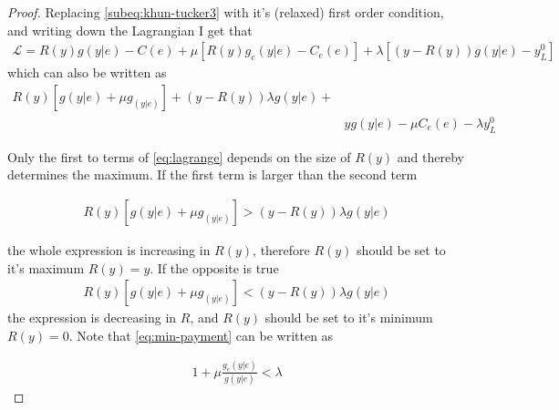 \begin{proof}
Replacing \cref{subeq:khun-tucker3} with it's (relaxed) first order condition, and writing down the Lagrangian I get that 
\begin{align}
    \mathcal{L}=R(y)g(y|e)-C(e)+\mu [R(y)g_e(y|e)-C_e(e)]+\lambda [(y-R(y))g(y|e)-y_L^0]
\end{align}
which can also be written as 
\begin{equation}
\begin{split}
   R(y)\left[g(y|e)+\mu g_(y|e)\right]+(y-R(y))\lambda g(y|e)+ \\
                         & yg(y|e)-\mu C_e(e)-\lambda y_L^0 \label{eq:lagrange}
\end{split}
\end{equation}

Only the first to terms of \cref{eq:lagrange} depends on the size of $R(y)$ and thereby determines the maximum. If the first term is larger than the second term

\begin{align}
     R(y)\left[g(y|e)+\mu g_(y|e)\right]>(y-R(y))\lambda g(y|e) \label{eq:max-payment}
\end{align}

the whole expression is increasing in $R(y)$, therefore $R(y)$ should be set to it's maximum $R(y)=y$. If the opposite is true 
\begin{align}
     R(y)\left[g(y|e)+\mu g_(y|e)\right]<(y-R(y))\lambda g(y|e) \label{eq:min-payment}
\end{align}
the expression is decreasing in $R$, and $R(y)$ should be set to it's minimum $R(y)=0$. Note that \cref{eq:min-payment} can be written as

\begin{align}
   1+\mu \frac{g_e(y|e)}{g(y|e)}<\lambda \label{eq:min-payment-2}
\end{align}


\end{proof}
